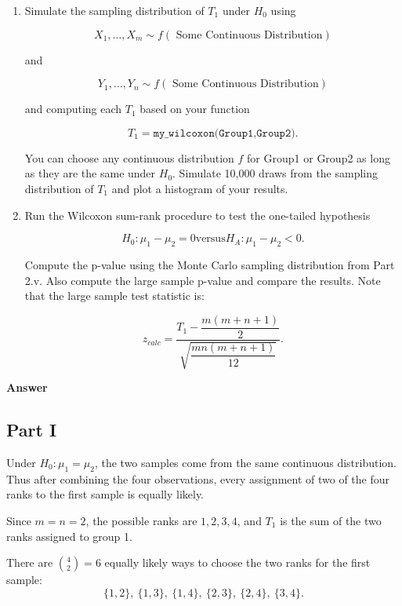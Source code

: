 \documentclass[letterpaper]{article}
\begin{document}
\begin{enumerate}
			\[
			\texttt{wilcox.test(Group1,Group2)}
			\]
			
			is technically computing the Mann-Whitney $U$ statistic.
			
			\item[v] Simulate the sampling distribution of $T_1$ under $H_0$ using
			
			\[
			X_1,\dots,X_m \sim f
			(\text{ Some Continuous Distribution})
			\]
			
			and
			
			\[
			Y_1,\dots,Y_n \sim f
			(\text{ Some Continuous Distribution})
			\]
			
			and computing each $T_1$ based on your function
			
			\[
			T_1=\texttt{my\_wilcoxon(Group1,Group2)}.
			\]
			
			You can choose any continuous distribution $f$ for Group1 or Group2 as long as they are the same under $H_0$. Simulate 10,000 draws from the sampling distribution of $T_1$ and plot a histogram of your results.
			
			
			\item[vi] Run the Wilcoxon sum-rank procedure to test the one-tailed hypothesis
			
			\[
			H_0 : \mu_1 - \mu_2 = 0 
			\text{versus} 
			H_A : \mu_1 - \mu_2 < 0.
			\]
			
			Compute the p-value using the Monte Carlo sampling distribution from Part 2.v. Also compute the large sample p-value and compare the results. Note that the large sample test statistic is:
			
			\[
			z_{calc}=
			\frac{
				T_1-\dfrac{m(m+n+1)}{2}
			}{
				\sqrt{\dfrac{mn(m+n+1)}{12}}
			}.
			\]
		\end{enumerate}
		
		\textbf{Answer}
		
		\subsection{Part I}
		
		
		Under $H_0:\mu_1=\mu_2$, the two samples come from the same continuous distribution.
		Thus after combining the four observations, every assignment of two of the four
		ranks to the first sample is equally likely.
		
		Since $m=n=2$, the possible ranks are $1,2,3,4$, and $T_1$ is the sum of the two
		ranks assigned to group 1.
		
		There are $\binom{4}{2}=6$ equally likely ways to choose the two ranks for the
		first sample:
		\[
		\{1,2\},\ \{1,3\},\ \{1,4\},\ \{2,3\},\ \{2,4\},\ \{3,4\}.
		\]
		
\end{document}
